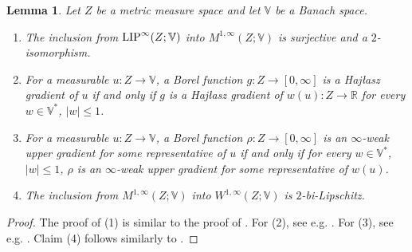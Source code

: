 \documentclass[reqno]{amsart}
\newcommand{\LIP}{{\rm LIP}}
\numberwithin{equation}{section}
\newtheorem{lemma}[theorem]{Lemma}
\theoremstyle{remark}
\newcommand{\R}{\mathbb{R}}
\begin{document}
\begin{lemma}\label{lem:Banach_valued}
Let $Z$ be a metric measure space and let $\mathbb V$ be a Banach space. 
\begin{enumerate}
    \item The inclusion from $\LIP^{\infty}(Z; \mathbb{V} )$ into $M^{1,\infty}(Z;\mathbb V)$ is surjective and a $2$-isomorphism.
    \item For a measurable $u\colon Z \to \mathbb V$, a Borel function $g\colon Z \to [0,\infty]$ is a Haj{\l}asz gradient of $u$ if and only if $g$ is a Haj{\l}asz gradient of $w(u)\colon Z\to \R$ for every $w\in\mathbb V^*$, $|w|\leq 1$.
    \item For a measurable $u\colon Z\to \mathbb V$, a Borel function $\rho \colon Z \to [0,\infty]$ is an $\infty$-weak upper gradient for some representative of $u$ if and only if for every $w\in\mathbb V^*$, $|w|\leq 1$, $\rho$ is an $\infty$-weak upper gradient for some representative of $w(u)$.
    \item The inclusion from $M^{1,\infty}(Z; \mathbb{V} )$ into $W^{1,\infty}(Z; \mathbb{V} )$ is $2$-bi-Lipschitz.
\end{enumerate}
\end{lemma}
\begin{proof}
The proof of (1) is similar to the proof of . For (2), see e.g. \cite[Lemma 3.3]{Garc:Iko:Zhu:23}. For (3), see e.g. \cite[Lemma 3.9]{Garc:Iko:Zhu:23}. Claim (4) follows similarly to .
\end{proof}
\end{document}
